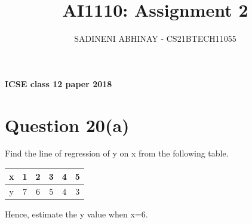 \documentclass[journal,12pt,twocolumn]{IEEEtran}
\DeclareMathOperator*{\Res}{Res}
\begin{document}
	
	\newcommand{\BEQA}{\begin{eqnarray}}
		\newcommand{\EEQA}{\end{eqnarray}}
	\newcommand{\define}{\stackrel{\triangle}{=}}
	
	\raggedbottom
	\setlength{\parindent}{0pt}
	\providecommand{\mbf}{\mathbf}
	\providecommand{\pr}[1]{\ensuremath{\Pr\left(#1\right)}}
	\providecommand{\qfunc}[1]{\ensuremath{Q\left(#1\right)}}
	\providecommand{\sbrak}[1]{\ensuremath{{}\left[#1\right]}}
	\providecommand{\lsbrak}[1]{\ensuremath{{}\left[#1\right.}}
	\providecommand{\rsbrak}[1]{\ensuremath{{}\left.#1\right]}}
	\providecommand{\brak}[1]{\ensuremath{\left(#1\right)}}
	\providecommand{\lbrak}[1]{\ensuremath{\left(#1\right.}}
	\providecommand{\rbrak}[1]{\ensuremath{\left.#1\right)}}
	\providecommand{\cbrak}[1]{\ensuremath{\left\{#1\right\}}}
	\providecommand{\lcbrak}[1]{\ensuremath{\left\{#1\right.}}
	\providecommand{\rcbrak}[1]{\ensuremath{\left.#1\right\}}}
	\theoremstyle{remark}
	\newtheorem{rem}{Remark}
	\newcommand{\sgn}{\mathop{\mathrm{sgn}}}
	\providecommand{\abs}[1]{$\left\vert#1\right\vert$}
	\providecommand{\res}[1]{\Res\displaylimits_{#1}} 
	\providecommand{\norm}[1]{$\left\lVert#1\right\rVert$}
	\providecommand{\mtx}[1]{\mathbf{#1}}
	\providecommand{\mean}[1]{E$\left[ #1 \right]$}
	\providecommand{\fourier}{\overset{\mathcal{F}}{ \rightleftharpoons}}
	\providecommand{\system}{\overset{\mathcal{H}}{ \longleftrightarrow}}
	\newcommand{\solution}{\noindent \textbf{Solution: }}
	\newcommand{\cosec}{\,\text{cosec}\,}
	\providecommand{\dec}[2]{\ensuremath{\overset{#1}{\underset{#2}{\gtrless}}}}
	\newcommand{\myvec}[1]{\ensuremath{\begin{pmatrix}#1\end{pmatrix}}}
	\newcommand{\mydet}[1]{\ensuremath{\begin{vmatrix}#1\end{vmatrix}}}
	\makeatletter
	\makeatother
	\let\StandardTheFigure\thefigure
	\let\vec\mathbf
	\vspace{3cm}
	\title{AI1110: Assignment 2}
	\author{SADINENI ABHINAY - CS21BTECH11055}
	\maketitle
	\newpage
	\bigskip
	\renewcommand{\thefigure}{\theenumi}
	\renewcommand{\thetable}{\theenumi}
	\textbf{ICSE class 12 paper 2018}
	\section{Question 20(a)} 
	Find the line of regression of y on x from the following table.
	\begin{table}[H]
		\resizebox{\columnwidth}{!} {
			\begin{tabular}{|c|c|c|c|c|c|}
				\hline
				x &1 &2&3 & 4& 5 \\
				\hline
				y &7 & 6 & 5 &4 & 3\\
				\hline
			\end{tabular}
		}
	\end{table}
	Hence, estimate the y value when x=6.
	
\end{document}
